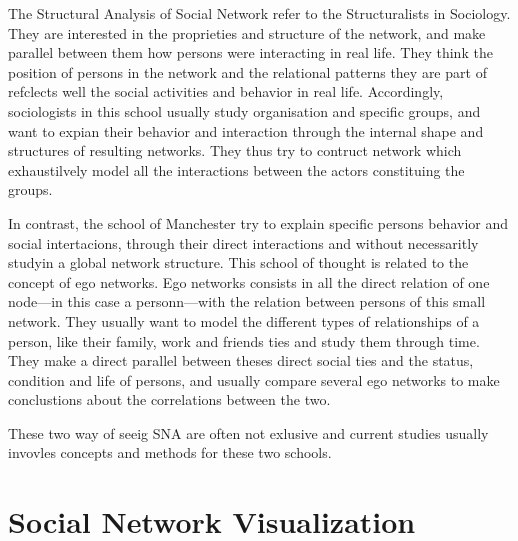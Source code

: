 The Structural Analysis of Social Network refer to the Structuralists in Sociology. They are interested in the proprieties and structure of the network, and make parallel between them how persons were interacting in real life. They think the position of persons in the network and the relational patterns they are part of refclects well the  social activities and behavior in real life. Accordingly, sociologists in this school usually study organisation and specific groups, and want to expian their behavior and interaction through the internal shape and structures of resulting networks. They thus try to contruct network which exhaustilvely model all the interactions between the actors constituing the groups.

In contrast, the school of Manchester try to explain specific persons behavior and social intertacions, through their direct interactions and without necessaritly studyin a global network structure. This school of thought is related to the concept of ego networks. Ego networks consists in all the direct relation of one node---in this case a personn---with the relation between persons of this small network. They usually want to model the different types of relationships of a person, like their family, work and friends ties and study them through time. They make a direct parallel between theses direct social ties and the status, condition and life of persons, and usually compare several ego networks to make conclustions about the correlations between the two.

These two way of seeig SNA are often not exlusive and current studies usually invovles concepts and methods for these two schools.


\section{Social Network Visualization}




